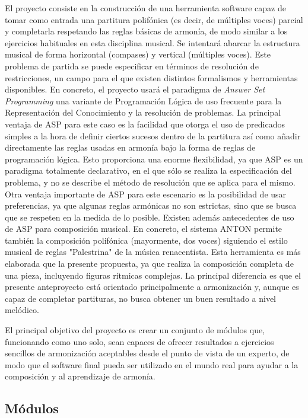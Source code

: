 El proyecto consiste en la construcción de una herramienta software capaz de tomar como entrada una partitura polifónica (es decir, de múltiples voces) parcial y completarla respetando las reglas básicas de armonía, de modo similar a los ejercicios habituales en esta disciplina musical. Se intentará abarcar la estructura musical de forma horizontal (compases) y vertical (múltiples voces). Este problema de partida se puede especificar en términos de resolución de restricciones, un campo para el que existen distintos formalismos y herramientas disponibles. En concreto, el proyecto usará el paradigma de \textit{Answer Set Programming} una variante de Programación Lógica de uso frecuente para la Representación del Conocimiento y la resolución de problemas. La principal ventaja de ASP para este caso es la facilidad que otorga el uso de predicados simples a la hora de definir ciertos sucesos dentro de la partitura así como añadir directamente las reglas usadas en armonía bajo la forma de reglas de programación lógica. Esto proporciona una enorme flexibilidad, ya que ASP es un paradigma totalmente declarativo, en el que sólo se realiza la especificación del problema, y no se describe el método de resolución que se aplica para el mismo. Otra ventaja importante de ASP para este escenario es la posibilidad de usar preferencias, ya que algunas reglas armónicas no son estrictas, sino que se busca que se respeten en la medida de lo posible. Existen además antecedentes de uso de ASP para composición musical. En concreto, el sistema ANTON permite también la composición polifónica (mayormente, dos voces) siguiendo el estilo musical de reglas "Palestrina" de la música renacentista. Esta herramienta es más elaborada que la presente propuesta, ya que realiza la composición completa de una pieza, incluyendo figuras rítmicas complejas. La principal diferencia es que el presente anteproyecto está orientado principalmente a armonización y, aunque es capaz de completar partituras, no busca obtener un buen resultado a nivel melódico.

El principal objetivo del proyecto es crear un conjunto de módulos que, funcionando como uno solo, sean capaces de ofrecer resultados a ejercicios sencillos de armonización aceptables desde el punto de vista de un experto, de modo que el software final pueda ser utilizado en el mundo real para ayudar a la composición y al aprendizaje de armonía.

\subsection{Módulos}

